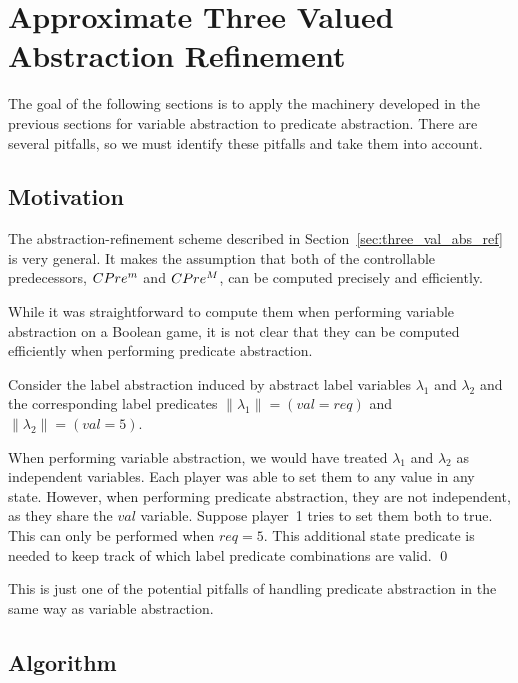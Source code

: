 \section{Approximate Three Valued Abstraction Refinement}
\label{sec:approx_three_val}

The goal of the following sections is to apply the machinery developed in the previous sections for variable abstraction to predicate abstraction. There are several pitfalls, so we must identify these pitfalls and take them into account.

\subsection{Motivation}
The abstraction-refinement scheme described in Section~\ref{sec:three_val_abs_ref} is very general. It makes the assumption that both of the controllable predecessors, $CPre^m$ and $CPre^M$, can be computed precisely and efficiently.

While it was straightforward to compute them when performing variable abstraction on a Boolean game, it is not clear that they can be computed efficiently when performing predicate abstraction.

\begin{ex}
    \everymath{\mathtt{\xdef\tmp{\fam\the\fam\relax}\aftergroup\tmp}}
    \everydisplay{\mathtt{\xdef\tmp{\fam\the\fam\relax}\aftergroup\tmp}}
    Consider the label abstraction induced by abstract label variables $\lambda_1$ and $\lambda_2$ and the corresponding label predicates $\|\lambda_1\| = (val=req)$ and $\|\lambda_2\| = (val=5)$.

    When performing variable abstraction, we would have treated $\lambda_1$ and $\lambda_2$ as independent variables. Each player was able to set them to any value in any state. However, when performing predicate abstraction, they are not independent, as they share the $val$ variable. Suppose player~1 tries to set them both to true. This can only be performed when $req=5$. This additional state predicate is needed to keep track of which label predicate combinations are valid.
    \qed
\end{ex}

This is just one of the potential pitfalls of handling predicate abstraction in the same way as variable abstraction. 

\subsection{Algorithm}

